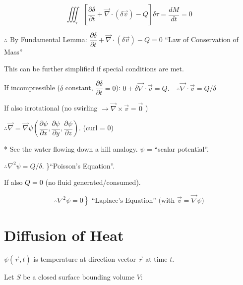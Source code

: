 \documentclass{report}
\begin{document}
$$
\displaystyle\iiint_{\tau}\left[\dfrac{\partial \delta}{\partial t}+\vec{\nabla} \cdot(\delta \vec{v})-Q\right] \delta \tau=\dfrac{d M}{d t}=0
$$

$\therefore$ By Fundamental Lemma: $\dfrac{\partial \delta}{\partial t}+\vec{\nabla} \cdot(\delta \vec{v})-Q=0$ ``Law of Conservation of Mass''

This can be further simplified if special conditions are met.

If incompressible ($\delta$ constant, $\dfrac{\partial \delta}{\partial t} = 0$): $0+\delta \vec{\nabla} \cdot \vec{v}=Q. \quad \therefore \vec{\nabla} \cdot \vec{v}=Q / \delta$

If also irrotational (no swirling $\rightarrow \vec{\nabla} \times \vec{v}=\overrightarrow{0}$ )

$\therefore \vec{\nabla}=\vec{\nabla} \psi\left(\dfrac{\partial \psi}{\partial x}, \dfrac{\partial \psi}{\partial y}, \dfrac{\partial \psi}{\partial z}\right).$ \quad  (curl = 0)

* See the water flowing down a hill analogy. $\psi$ = ``scalar potential''.


$\therefore \nabla^{2} \psi=Q / \delta$. \}``Poisson's Equation''.

If also $Q=0$ (no fluid generated/consumed).

$$
\left.\therefore \nabla^{2} \psi=0\right\} \text { ``Laplace's Equation'' (with } \vec{v}=\vec{\nabla} \psi)
$$

\section{Diffusion of Heat} 

$\psi(\vec{r}, t)$ is temperature at direction vector $\vec{r}$ at time $t$.

Let $S$ be a closed surface bounding volume $V$:
\end{document}
